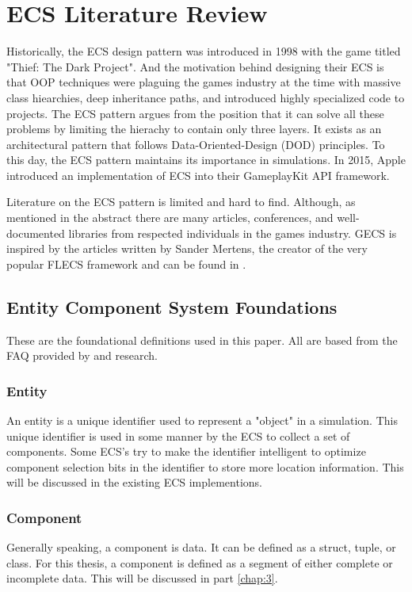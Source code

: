 \section{ECS Literature Review}
\label{chap:1}

Historically, the ECS design pattern was introduced in 1998 with the game titled "Thief: The Dark Project".\cite{RomeoPHD} And the 
motivation behind designing their ECS is that OOP techniques were plaguing the games industry at the time with massive class 
hiearchies, deep inheritance paths, and introduced highly specialized code to projects\cite{Haerkoenen2019}. 
The ECS pattern argues from the position that it can solve all these problems by limiting the hierachy to contain only three layers. It exists as an architectural pattern that follows Data-Oriented-Design (DOD) principles.\cite{RomeoPHD} To this day, the ECS pattern maintains its importance in simulations. In 2015, Apple introduced an implementation of ECS into their GameplayKit API framework. \cite{AppleECS}

Literature on the ECS pattern is limited and hard to find. Although, as mentioned in the abstract there are many articles, conferences, and well-documented libraries from respected individuals in the games industry. GECS is inspired by the articles written by Sander Mertens, the creator of the very popular FLECS framework and can be found in \cite{SanderMertensECS}. 

\subsection{Entity Component System Foundations}
These are the foundational definitions used in this paper. All are based from the FAQ provided by \cite{SanderMertensFAQ} and \cite{RomeoPHD} research.

\subsubsection{Entity}
    An entity is a unique identifier used to represent a "object" in a simulation. This unique identifier is used in some manner by the ECS to collect a set of components. Some ECS's try to make the identifier intelligent to optimize component selection bits in the identifier to store more location information. This will be discussed in the existing ECS implementions.

\subsubsection{Component}
    Generally speaking, a component is data. It can be defined as a struct, tuple, or class. For this thesis, a component is defined as a segment of either complete or incomplete data. This will be discussed in part \ref{chap:3}.

